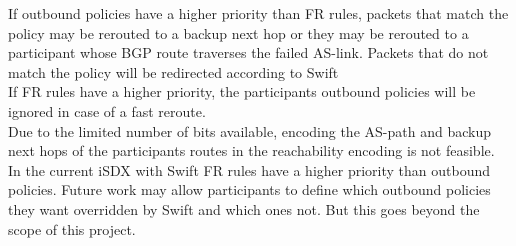 If outbound policies have a higher priority than FR rules, packets that match the policy may be rerouted to a backup next hop or they may be rerouted to a participant whose BGP route traverses the failed AS-link. Packets that do not match the policy will be redirected according to Swift\\
If FR rules have a higher priority, the participants outbound policies will be ignored in case of a fast reroute. \\
Due to the limited number of bits available, encoding the AS-path and backup next hops of the participants routes in the reachability encoding is not feasible. In the current iSDX with Swift FR rules have a higher priority than outbound policies. Future work may allow participants to define which outbound policies they want overridden by Swift and which ones not. But this goes beyond the scope of this project.

